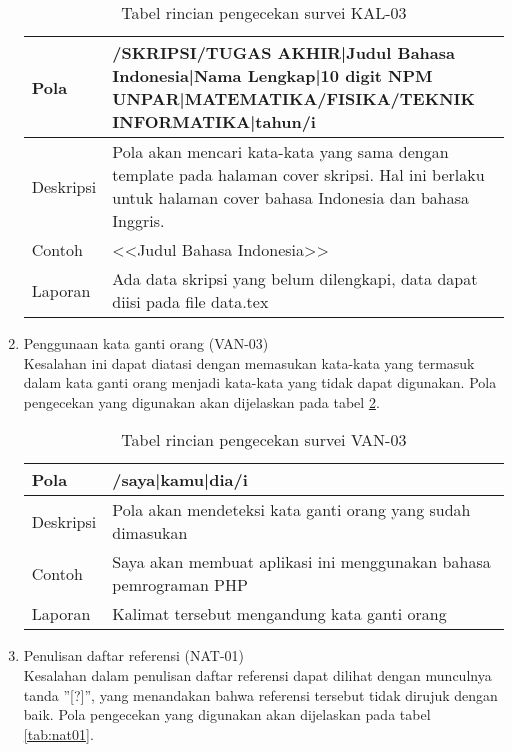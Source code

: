 \begin{enumerate}
	\begin{table}[H]
		\renewcommand{\arraystretch}{1.5}
		\caption {Tabel rincian pengecekan survei KAL-03} 
		\label{tab:kal03}
		\begin{center}
			\begin{tabular}{|p{3.5cm} |p{10.5cm}|}
			\hline 
			Pola & /SKRIPSI/TUGAS AKHIR|Judul Bahasa Indonesia|Nama Lengkap|10 digit NPM UNPAR|MATEMATIKA/FISIKA/TEKNIK INFORMATIKA|tahun/i \\ 
			\hline 
			Deskripsi & Pola akan mencari kata-kata yang sama dengan template pada halaman cover skripsi. Hal ini berlaku untuk halaman cover bahasa Indonesia dan bahasa Inggris. \\ 
			\hline 
			Contoh & <<Judul Bahasa Indonesia>> \\ 
			\hline 
			Laporan & Ada data skripsi yang belum dilengkapi, data dapat diisi pada file data.tex \\ 
			\hline
			\end{tabular}
		\end{center}
	\end{table}
	
	\item Penggunaan kata ganti orang (VAN-03) \\
	Kesalahan ini dapat diatasi dengan memasukan kata-kata yang termasuk dalam kata ganti orang menjadi kata-kata yang tidak dapat digunakan. Pola pengecekan yang digunakan akan dijelaskan pada tabel \ref{tab:van03}.
		
	\begin{table}[H]
		\renewcommand{\arraystretch}{1.5}
		\caption {Tabel rincian pengecekan survei VAN-03} 
		\label{tab:van03}
		\begin{center}
			\begin{tabular}{|p{3.5cm} |p{10.5cm}|}
			\hline 
			Pola & /saya|kamu|dia/i \\ 
			\hline 
			Deskripsi & Pola akan mendeteksi kata ganti orang yang sudah dimasukan \\ 
			\hline 
			Contoh & Saya akan membuat
aplikasi ini menggunakan bahasa pemrograman PHP \\ 
			\hline 
			Laporan & Kalimat tersebut mengandung kata ganti orang \\ 
			\hline
			\end{tabular}
		\end{center}
	\end{table}
	
	\item Penulisan daftar referensi (NAT-01) \\
	Kesalahan dalam penulisan daftar referensi dapat dilihat dengan munculnya tanda ''[?]'', yang menandakan bahwa referensi tersebut tidak dirujuk dengan baik. Pola pengecekan yang digunakan akan dijelaskan pada tabel \ref{tab:nat01}.
		

\end{enumerate}
